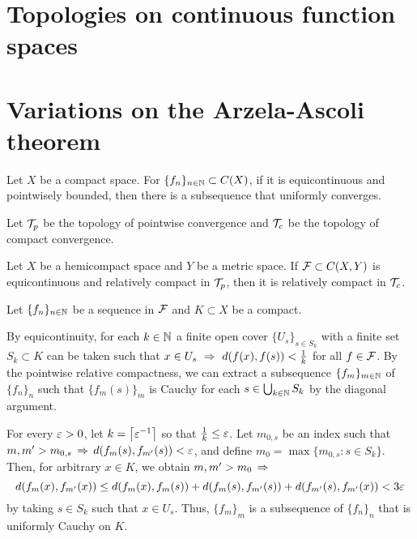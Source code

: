 \documentclass{../exp}
\begin{document}
\section{Topologies on continuous function spaces}


\iffalse

$C(X,Y)$ has the compact-open topology
When $Y$ is uniform, $C(X,Y)$ has the topology of compact convergence
When $X$ is compact and $Y$ is uniform, $C(X,Y)$ has the topology of uniform convergence


When $X$ is locally compact Hausdorff, and the exponential space is endowed with compact-open topology

\fi


\section{Variations on the Arzela-Ascoli theorem}

\begin{thm}
Let $X$ be a compact space.
For $\{f_n\}_{n\in\mathbb{N}}\subset C(X)$, if it is equicontinuous and pointwisely bounded, then there is a subsequence that uniformly converges.
\end{thm}

Let $\mathcal{T}_p$ be the topology of pointwise convergence and $\mathcal{T}_c$ be the topology of compact convergence.

\begin{thm}
Let $X$ be a hemicompact space and $Y$ be a metric space.
If $\mathcal{F}\subset C(X,Y)$ is equicontinuous and relatively compact in $\mathcal{T}_p$, then it is relatively compact in $\mathcal{T}_c$.
\end{thm}
\begin{pf}
Let $\{f_n\}_{n\in\mathbb{N}}$ be a sequence in $\mathcal{F}$ and $K\subset X$ be a compact.

By equicontinuity, for each $k\in\mathbb{N}$ a finite open cover $\{U_s\}_{s\in S_k}$ with a finite set $S_k\subset K$ can be taken such that $x\in U_s\,\impl\,d(f(x),f(s))<\frac1k$ for all $f\in\mathcal{F}$.
By the pointwise relative compactness, we can extract a subsequence $\{f_m\}_{m\in\mathbb{N}}$ of $\{f_n\}_n$ such that $\{f_m(s)\}_m$ is Cauchy for each $s\in\bigcup_{k\in\mathbb{N}}S_k$ by the diagonal argument.

For every $\varepsilon>0$, let $k=\left\lceil\varepsilon^{-1}\right\rceil$ so that $\frac1k\le\varepsilon$.
Let $m_{0,s}$ be an index such that $m,m'>m_{0,s}\impl d(f_m(s),f_{m'}(s))<\e$, and define $m_0=\max\{m_{0,s}:s\in S_k\}$.
Then, for arbitrary $x\in K$, we obtain $m,m'>m_0\impl$
\[d(f_m(x),f_{m'}(x))\le d(f_m(x),f_m(s))+d(f_m(s),f_{m'}(s))+d(f_{m'}(s),f_{m'}(x))<3\varepsilon\]
by taking $s\in S_k$ such that $x\in U_s$.
Thus, $\{f_m\}_m$ is a subsequence of $\{f_n\}_n$ that is uniformly Cauchy on $K$.
\end{pf}
\end{document}
